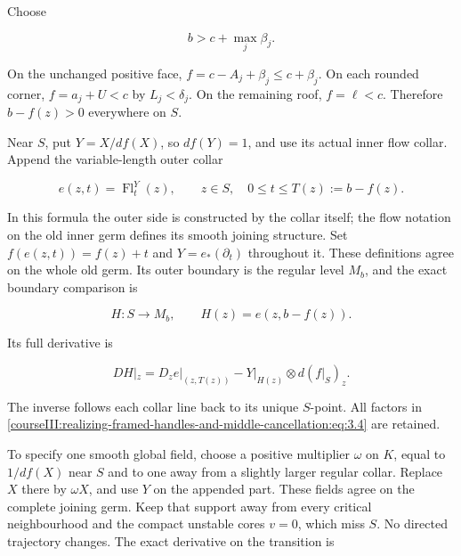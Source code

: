 \label{courseIII:realizing-framed-handles-and-middle-cancellation:section-3}\label{courseIII:middle-cancel:3}

Choose

\begin{equation}
b>c+\max_j\beta_j.
 \label{courseIII:realizing-framed-handles-and-middle-cancellation:eq:3.1}
\end{equation}

On the unchanged positive face, \(f=c-A_j+\beta_j\leq c+\beta_j\). On each rounded corner, \(f=a_j+U<c\) by \(L_j<\delta_j\). On the remaining roof, \(f=\ell<c\). Therefore \(b-f(z)>0\) everywhere on \(S\).

Near \(S\), put \(Y=X/df(X)\), so \(df(Y)=1\), and use its actual inner flow collar. Append the variable-length outer collar

\begin{equation}
e(z,t)=\operatorname{Fl}^{Y}_t(z),\qquad
 z\in S,\quad 0\leq t\leq T(z):=b-f(z).
 \label{courseIII:realizing-framed-handles-and-middle-cancellation:eq:3.2}
\end{equation}

In this formula the outer side is constructed by the collar itself; the flow notation on the old inner germ defines its smooth joining structure. Set \(f(e(z,t))=f(z)+t\) and \(Y=e_*(\partial_t)\) throughout it. These definitions agree on the whole old germ. Its outer boundary is the regular level \(M_b\), and the exact boundary comparison is

\begin{equation}
H:S\longrightarrow M_b,\qquad
 H(z)=e(z,b-f(z)).
 \label{courseIII:realizing-framed-handles-and-middle-cancellation:eq:3.3}
\end{equation}

Its full derivative is

\begin{equation}
DH|_z=D_z e|_{(z,T(z))}
                   -Y|_{H(z)}\otimes d(f|_S)_z.
 \label{courseIII:realizing-framed-handles-and-middle-cancellation:eq:3.4}
\end{equation}

The inverse follows each collar line back to its unique \(S\)-point. All factors in \eqref{courseIII:realizing-framed-handles-and-middle-cancellation:eq:3.4} are retained.

To specify one smooth global field, choose a positive multiplier \(\omega\) on \(K\), equal to \(1/df(X)\) near \(S\) and to one away from a slightly larger regular collar. Replace \(X\) there by \(\omega X\), and use \(Y\) on the appended part. These fields agree on the complete joining germ. Keep that support away from every critical neighbourhood and the compact unstable cores \(v=0\), which miss \(S\). No directed trajectory changes. The exact derivative on the transition is

